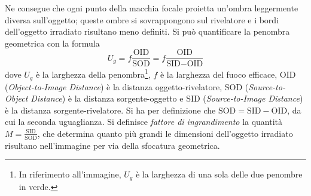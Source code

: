 \documentclass[11pt, a4paper]{scrartcl}
\theoremstyle{style}
\theoremstyle{style1}
\numberwithin{equation}{subsection}
\begin{document}
\begin{center}
\begin{minipage}
{\begin{tikzpicture}[
    x=0.025cm,
    y=-0.025cm,
    line cap=round,
    line join=round
]
\fill[ombra,opacity=0.95]
    (245,320) rectangle (335,332);

\fill[penombra,opacity=0.85]
    (335,320) rectangle (395,332);

\fill[detettore,rounded corners=1pt]
    (158,335) rectangle (422,344);

\node[anchor=base west,font=\sffamily\footnotesize]
    at (431,344) {Rivelatore};

\draw[annotazioni,line width=0.65pt]
    (185,347) -- (185,353) --
    (245,353) -- (245,347);

\draw[annotazioni,line width=0.65pt]
    (335,347) -- (335,353) --
    (395,353) -- (395,347);

\node[
    font=\sffamily\footnotesize\bfseries,
    text=annotazioni,
    anchor=base
] at (215,369) {Penombra};

\node[
    font=\sffamily\footnotesize,
    anchor=base
] at (290,369) {Ombra piena};

\node[
    font=\sffamily\footnotesize\bfseries,
    text=annotazioni,
    anchor=base
] at (365,369) {Penombra};

\end{tikzpicture}
}
	\end{minipage}
\end{center}
Ne consegue che ogni punto della macchia focale proietta un'ombra leggermente diversa sull'oggetto; queste ombre si sovrappongono sul rivelatore e i bordi dell'oggetto irradiato risultano meno definiti.
Si pu\`o quantificare la penombra geometrica con la formula 
\begin{equation}
	U_g =f \frac{\text{OID}}{\text{SOD}} = f \frac{\text{OID}}{\text{SID}-\text{OID}}
\end{equation}
dove $U_g$ \`e la larghezza della penombra\footnote{In riferimento all'immagine, $U_g$ \`e la larghezza di una sola delle due penombre in verde.}, $f$ \`e la larghezza del fuoco efficace, OID (\textit{Object-to-Image Distance}) \`e la distanza oggetto-rivelatore, SOD (\textit{Source-to-Object Distance}) \`e la distanza sorgente-oggetto e SID (\textit{Source-to-Image Distance}) \`e la distanza sorgente-rivelatore.
Si ha per definizione che $\text{SOD}= \text{SID}-\text{OID}$, da cui la seconda uguaglianza.
Si definisce \textit{fattore di ingrandimento} la quantit\`a $M = \frac{\text{SID}}{\text{SOD}}$, che determina quanto pi\`u grandi le dimensioni dell'oggetto irradiato risultano nell'immagine per via della sfocatura geometrica.
\end{document}
